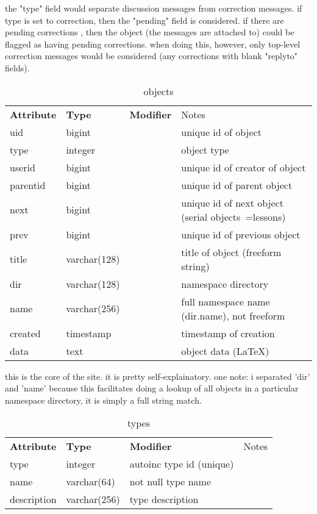 the "type" field would separate discussion messages from correction messages.  if type is set to correction, then the "pending" field is considered.  if there are pending corrections , then the object (the messages are attached to) could be flagged as having pending corrections.  when doing this, however, only top-level correction messages would be considered (any corrections with blank
"replyto" fields).  

\begin{table}
\begin{center}
\begin{tabular}{llll}
{\bf Attribute } & {\bf Type} & {\bf Modifier} & Notes \\
 uid       & bigint       &      &       unique id of object \\
 type      & integer      &      &       object type  \\
 userid    & bigint       &      &       unique id of creator of object \\
 parentid  & bigint       &      &       unique id of parent object \\
 next      & bigint       &      &       unique id of next object (serial objects~=lessons) \\
 prev      & bigint       &      &       unique id of previous object \\
 title     & varchar(128) &      &       title of object (freeform string) \\
 dir       & varchar(128) &      &       namespace directory \\
 name      & varchar(256) &      &       full namespace name (dir.name), not freeform  \\
 created   & timestamp    &      &       timestamp of creation \\
 data      & text         &      &       object data (LaTeX) 
\end{tabular}
\end{center}
\caption{objects}
\end{table}

this is the core of the site.  it is pretty self-explainatory. one note: i separated 'dir' and 'name' because this facilitates doing a lookup of all objects in a particular namespace directory, it is simply a full string match.

\begin{table}
\begin{center}
\begin{tabular}{llll}
{\bf Attribute } & {\bf Type} & {\bf Modifier} & Notes \\
 type        & integer      & autoinc   type id (unique)  \\
 name        & varchar(64)  & not null  type name \\
 description & varchar(256) &           type description \\
\end{tabular}
\end{center}
\caption{types}
\end{table}
				 
